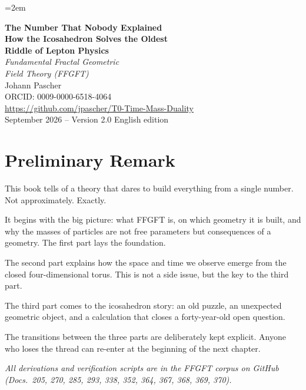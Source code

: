\documentclass[12pt,oneside]{book}
\begin{document}
\hfuzz=3pt\vfuzz=3pt
\emergencystretch=2em
\sloppy

\frontmatter
\pagestyle{fancy}
\makeatletter\let\ps@plain\ps@fancy\makeatother
\begin{titlepage}
  \centering\vspace*{1.5cm}
  {\Huge\bfseries\color{ffgblue}The Number That Nobody Explained}\\[0.6cm]
  {\Large\bfseries\color{ffgblue!70}How the Icosahedron Solves the Oldest\\[0.2cm]Riddle of Lepton Physics}\\[1.5cm]
  {\LARGE\itshape Fundamental Fractal Geometric\\[0.2cm]Field Theory (FFGFT)}\\[2cm]
  {\large Johann Pascher}\\[0.3cm]
  {\normalsize ORCID: 0009-0000-6518-4064}\\[0.3cm]
  {\normalsize\url{https://github.com/jpascher/T0-Time-Mass-Duality}}\\[1.5cm]
  {\normalsize September 2026 -- Version 2.0}\vfill
  {\small English edition}
\end{titlepage}
\tableofcontents

\chapter*{Preliminary Remark}

This book tells of a theory that dares to build everything from a single number. Not approximately. Exactly.

It begins with the big picture: what FFGFT is, on which geometry it is built, and why the masses of particles are not free parameters but consequences of a geometry. The first part lays the foundation.

The second part explains how the space and time we observe emerge from the closed four-dimen\-sional torus. This is not a side issue, but the key to the third part.

The third part comes to the icosa\-hedron story: an old puzzle, an unexpected geometric object, and a calculation that closes a forty-year-old open question.

The transitions between the three parts are deliberately kept explicit. Anyone who loses the thread can re-enter at the beginning of the next chapter.

\vspace{0.5cm}
\noindent\textit{All derivations and verification scripts are in the FFGFT corpus on GitHub (Docs.~205, 270, 285, 293, 338, 352, 364, 367, 368, 369, 370).}
\end{document}
